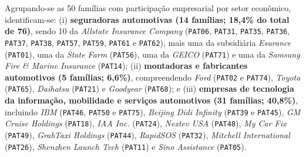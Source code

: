\documentclass[12pt,a4paper]{article}
\begin{document}
\sloppy
Agrupando-se as 50 famílias com participação empresarial por setor econômico, identificam-se: (i) \textbf{seguradoras automotivas (14 famílias; 18,4\% do total de 76)}, sendo 10 da \textit{Allstate Insurance Company} (\texttt{PAT06}, \texttt{PAT31}, \texttt{PAT35}, \texttt{PAT36}, \texttt{PAT37}, \texttt{PAT38}, \texttt{PAT57}, \texttt{PAT59}, \texttt{PAT61} e \texttt{PAT62}), mais uma da subsidiária \textit{Esurance} (\texttt{PAT01}), uma da \textit{State Farm} (\texttt{PAT56}), uma da \textit{GEICO} (\texttt{PAT71}) e uma da \textit{Samsung Fire \& Marine Insurance} (\texttt{PAT14}); (ii) \textbf{montadoras e fabricantes automotivos (5 famílias; 6,6\%)}, compreendendo \textit{Ford} (\texttt{PAT02} e \texttt{PAT74}), \textit{Toyota} (\texttt{PAT65}), \textit{Daihatsu} (\texttt{PAT21}) e \textit{Goodyear} (\texttt{PAT68}); e (iii) \textbf{empresas de tecnologia da informação, mobilidade e serviços automotivos (31 famílias; 40,8\%)}, incluindo \textit{IBM} (\texttt{PAT46}, \texttt{PAT50} e \texttt{PAT75}), \textit{Beijing Didi Infinity} (\texttt{PAT39} e \texttt{PAT45}), \textit{GM Cruise Holdings} (\texttt{PAT18}), \textit{IAA Inc.} (\texttt{PAT24}), \textit{Nextev USA} (\texttt{PAT48}), \textit{My Car Fix} (\texttt{PAT49}), \textit{GrabTaxi Holdings} (\texttt{PAT44}), \textit{RapidSOS} (\texttt{PAT32}), \textit{Mitchell International} (\texttt{PAT26}), \textit{Shenzhen Launch Tech} (\texttt{PAT11}) e \textit{Sino Assistance} (\texttt{PAT05}).
\fussy
\end{document}
